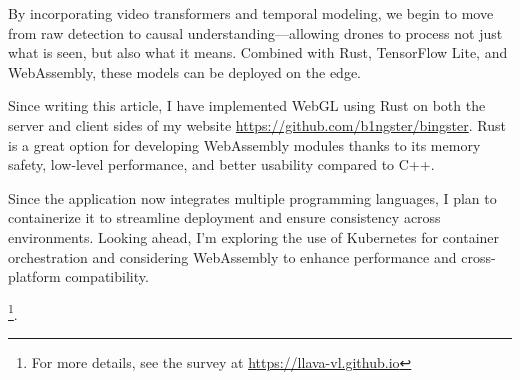 \documentclass{article}
\begin{document}
By incorporating video transformers and temporal modeling, we begin to move from raw detection to causal understanding—allowing drones to process not just what is seen, but also what it means. Combined with Rust, TensorFlow Lite, and WebAssembly, these models can be deployed on the edge.

Since writing this article, I have implemented WebGL using Rust on both the server and client sides of my website \url{https://github.com/b1ngster/bingster}. Rust is a great option for developing WebAssembly modules thanks to its memory safety, low-level performance, and better usability compared to C++. 

Since the application now integrates multiple programming languages, I plan to containerize it to streamline deployment and ensure consistency across environments. Looking ahead, I’m exploring the use of Kubernetes for container orchestration and considering WebAssembly to enhance performance and cross-platform compatibility.




\footnote{For more details, see the survey at \url{https://llava-vl.github.io}}.
\end{document}

